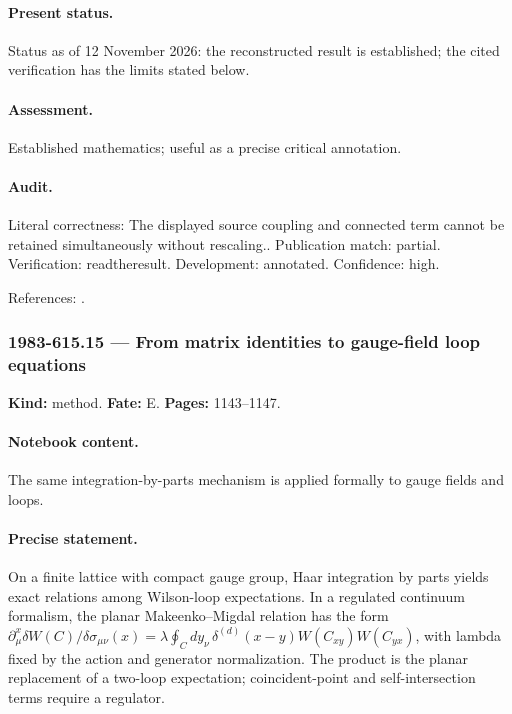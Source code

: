 \paragraph{Present status.} Status as of 12 November 2026: the reconstructed result is established; the cited verification has the limits stated below.

\paragraph{Assessment.} Established mathematics; useful as a precise critical annotation.

\paragraph{Audit.} Literal correctness: The displayed source coupling and connected term cannot be retained simultaneously without rescaling.. Publication match: partial. Verification: readtheresult. Development: annotated. Confidence: high.

\noindent References: \citep{makeenko2000large,brezinitzyksonparisizuber1978planar}.\par

\subsubsection{1983-615.15 --- From matrix identities to gauge-field loop equations}

\label{item:1983-615.15}

\noindent\textbf{Kind:} method. \textbf{Fate:} E. \textbf{Pages:} 1143--1147.\par

\paragraph{Notebook content.} The same integration-by-parts mechanism is applied formally to gauge fields and loops.

\paragraph{Precise statement.} On a finite lattice with compact gauge group, Haar integration by parts yields exact relations among Wilson-loop expectations. In a regulated continuum formalism, the planar Makeenko--Migdal relation has the form $\partial_\mu^x\delta W(C)/\delta\sigma_{\mu\nu}(x)=\lambda\oint_Cdy_\nu\,\delta^{(d)}(x-y)W(C_{xy})W(C_{yx})$, with lambda fixed by the action and generator normalization. The product is the planar replacement of a two-loop expectation; coincident-point and self-intersection terms require a regulator.

